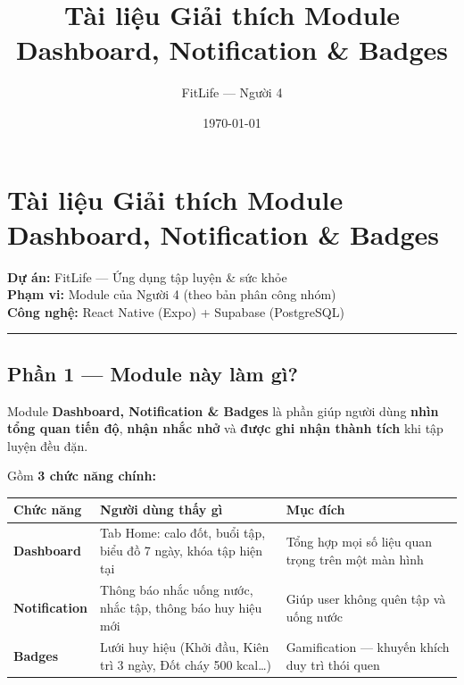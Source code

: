 \documentclass[12pt,a4paper]{article}
\title{Tài liệu Giải thích Module Dashboard, Notification \& Badges}
\author{FitLife --- Người 4}
\date{\today}
\newcounter{none}
\begin{document}
\maketitle
\tableofcontents
\newpage

\section{Tài liệu Giải thích Module Dashboard, Notification \&
Badges}\label{tuxe0i-liux1ec7u-giux1ea3i-thuxedch-module-dashboard-notification-badges}

\textbf{Dự án:} FitLife --- Ứng dụng tập luyện \& sức khỏe\\
\textbf{Phạm vi:} Module của Người 4 (theo bản phân công nhóm)\\
\textbf{Công nghệ:} React Native (Expo) + Supabase (PostgreSQL)

\begin{center}\rule{0.5\linewidth}{0.5pt}\end{center}

\subsection{Phần 1 --- Module này làm
gì?}\label{phux1ea7n-1-module-nuxe0y-luxe0m-guxec}

Module \textbf{Dashboard, Notification \& Badges} là phần giúp người
dùng \textbf{nhìn tổng quan tiến độ}, \textbf{nhận nhắc nhở} và
\textbf{được ghi nhận thành tích} khi tập luyện đều đặn.

Gồm \textbf{3 chức năng chính:}

{\def\LTcaptype{none} %
\begin{longtable}[]{@{}
  >{\raggedright\arraybackslash}p{}
  >{\raggedright\arraybackslash}p{}
  >{\raggedright\arraybackslash}p{}@{}}
\toprule\noalign{}
\begin{minipage}[b]{\linewidth}\raggedright
Chức năng
\end{minipage} & \begin{minipage}[b]{\linewidth}\raggedright
Người dùng thấy gì
\end{minipage} & \begin{minipage}[b]{\linewidth}\raggedright
Mục đích
\end{minipage} \\
\midrule\noalign{}
\endhead
\bottomrule\noalign{}
\endlastfoot
\textbf{Dashboard} & Tab Home: calo đốt, buổi tập, biểu đồ 7 ngày, khóa
tập hiện tại & Tổng hợp mọi số liệu quan trọng trên một màn hình \\
\textbf{Notification} & Thông báo nhắc uống nước, nhắc tập, thông báo
huy hiệu mới & Giúp user không quên tập và uống nước \\
\textbf{Badges} & Lưới huy hiệu (Khởi đầu, Kiên trì 3 ngày, Đốt cháy 500
kcal\ldots) & Gamification --- khuyến khích duy trì thói quen \\
\end{longtable}
}
\end{document}
